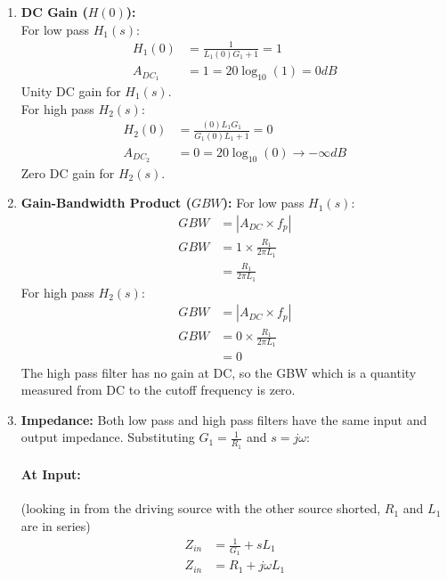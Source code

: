 \begin{enumerate}
\begin{align*}
        N_2(s) &= 0 \\
        s L_1 G_1 &= 0 \\
        s_z &= 0 \quad \text{[let \(s = s_z\)]} \\
        f_z &= \frac{|s_z|}{2\pi} = 0 Hz
      \end{align*}
      Zero at the origin for \(H_2(s)\).
    \item \textbf{DC Gain (\(H(0)\)):} \\
      For low pass \(H_1(s)\):
      \begin{align*}
        H_1(0) &= \frac{1}{L_1 (0) G_1 + 1} = 1 \\
        A_{DC_1} &= 1 = 20\log_{10}(1) = 0 dB
      \end{align*}
      Unity DC gain for \(H_1(s)\). \\
      For high pass \(H_2(s)\):
      \begin{align*}
        H_2(0) &= \frac{(0) L_1 G_1}{G_1 (0) L_1 + 1} = 0 \\
        A_{DC_2} &= 0 = 20\log_{10}(0) \to -\infty dB
      \end{align*}
      Zero DC gain for \(H_2(s)\).
    \item \textbf{Gain-Bandwidth Product (\(GBW\)):}
      For low pass \(H_1(s)\):
      \begin{align*}
        GBW &= |A_{DC} \times f_p| \\
        GBW &= 1 \times \frac{R_1}{2 \pi L_1} \\
            &= \frac{R_1}{2 \pi L_1}
      \end{align*}
      For high pass \(H_2(s)\):
      \begin{align*}
        GBW &= |A_{DC} \times f_p| \\
        GBW &= 0 \times \frac{R_1}{2 \pi L_1} \\
            &= 0
      \end{align*}
      The high pass filter has no gain at DC, so the GBW which
      is a quantity measured from DC to the cutoff frequency is
      zero.
    \item \textbf{Impedance:}
      Both low pass and high pass filters have the same input
      and output impedance.
      Substituting \(G_1 = \frac{1}{R_1}\) and \(s = j \omega\):
      \paragraph{At Input:} (looking in from the driving source with the other
      source shorted, \(R_1\) and \(L_1\) are in series)
        \begin{align*}
          Z_{in} &= \frac{1}{G_1} + s L_1 \\
          Z_{in} &= R_1 + j \omega L_1
        \end{align*}

\end{enumerate}
